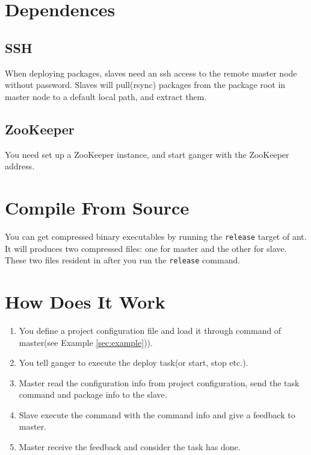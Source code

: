 \documentclass[]{article}
\newcommand{\file}{\begingroup \urlstyle{tt}\Url}
\newcommand{\program}[1]{\textsf{#1}}
\newcommand{\command}[1]{\texttt{#1}}
\newcommand{\mastername}{ganger}
\begin{document}
\section{Dependences}

\subsection{SSH}

When deploying packages, slaves need an ssh access to the remote master node without password. Slaves will pull(\program{rsync}) packages from the package root in master node to a default local path, and extract them. 

\subsection{ZooKeeper}
You need set up a \program{ZooKeeper} instance, and start \program{\mastername} with the \program{ZooKeeper} address.

\section{Compile From Source}

You can get compressed binary executables by running the \command{release} target of ant. It will
produces two compressed files: one for master and the other for slave. These two files resident in \file{target\release} after you run the \command{release} command.

\section{How Does It Work}

\begin{enumerate}
\item You define a project configuration file and load it through command of master(see Example \ref{sec:example})).
\item You tell \program{\mastername} to execute the deploy task(or start, stop etc.).
\item Master read the configuration info from project configuration, send the task command and package info to the slave.
\item Slave execute the command with the command info and give a feedback to master.
\item Master receive the feedback and consider the task has done.
\end{enumerate}
\end{document}
